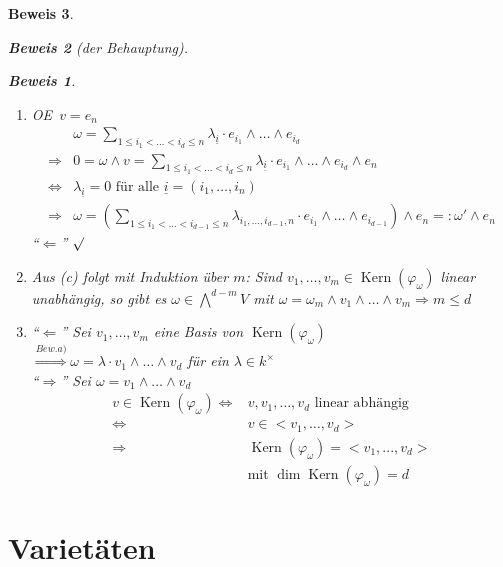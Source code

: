 \documentclass[a4paper,12pt]{report}
\theoremstyle{break}
\theoremstyle{nonumberbreak}
\theoremstyle{nonumberplain}
\newtheorem{Bew}{Beweis}
\newcommand{\defeql}[0]{=\mathrel{\mathop:}}
\DeclareMathOperator{\Kern}{Kern}
\renewcommand{\OE}{O\!\!E~}
\begin{document}
\begin{Bew}
\begin{enumerate}
\begin{Bew}[der Behauptung]
\begin{Bew}
\begin{enumerate}
      \item[(c)] \OE $v=e_n$
        \begin{align*}
          & \omega=\sum_{1\leq i_1 <\dots < i_d\leq n}\lambda_{\underline{i}}\cdot e_{i_1}\wedge\dots\wedge e_{i_d} \\
          \Rightarrow & 0=\omega\wedge v=\sum_{1\leq i_1 <\dots < i_d\leq n}\lambda_{\underline{i}}\cdot e_{i_1}\wedge\dots\wedge e_{i_d}\wedge e_n \\
          \Leftrightarrow & \lambda_{\underline{i}}=0\text{ für alle } \underline{i}=(i_1,\dots,i_n) \\
          \Rightarrow & \omega = \left(\sum_{1\leq i_1 <\dots < i_{d-1}\leq n}\lambda_{i_1,\dots,i_{d-1},n}\cdot e_{i_1}\wedge\dots\wedge e_{i_{d-1}}\right)
          \wedge e_n\defeql\omega'\wedge e_n
        \end{align*}
        ``$\Leftarrow$'' $\surd$
      \item[(a)] Aus (c) folgt mit Induktion über $m$: Sind $v_1,\dots,v_m\in\Kern(\varphi_\omega)$ linear unabhängig, so gibt es $\omega\in\bigwedge^{d-m}V$ mit
        $\omega=\omega_m\wedge v_1\wedge\dots\wedge v_m \Rightarrow m \leq d$
      \item[(b)] ``$\Leftarrow$'' Sei $v_1,\dots,v_m$ eine Basis von $\Kern(\varphi_\omega)$ \\
        $\stackrel{Bew. a)}{\Rightarrow}\omega=\lambda\cdot v_1\wedge\dots\wedge v_d$ für ein $\lambda\in k^\times$ \\
        ``$\Rightarrow$'' Sei $\omega=v_1\wedge\dots\wedge v_d$
        \begin{align*}
          v\in\Kern(\varphi_\omega) \Leftrightarrow & v,v_1,\dots,v_d\text{ linear abhängig } \\
          \Leftrightarrow & v\in<v_1,\dots,v_d> \\
          \Rightarrow & \Kern(\varphi_\omega)=<v_1,...,v_d>\\
          & \text{mit }\dim\Kern(\varphi_\omega)=d
        \end{align*}
      \end{enumerate}
    \end{Bew}
  \end{Bew}
\end{enumerate}
\end{Bew}





\section{Varietäten}
\end{document}
